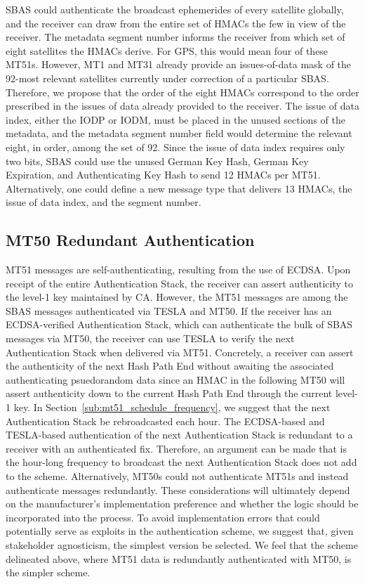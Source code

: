 \documentclass[letterpaper,times]{IONconf/IONconf}
\begin{document}
		SBAS could authenticate the broadcast ephemerides of every satellite globally, and the receiver can draw from the entire set of HMACs the few in view of the receiver.
		The metadata segment number informs the receiver from which set of eight satellites the HMACs derive.
		For GPS, this would mean four of these MT51s.
		However, MT1 and MT31 already provide an issues-of-data mask of the 92-most relevant satellites currently under correction of a particular SBAS.
		Therefore, we propose that the order of the eight HMACs correspond to the order prescribed in the issues of data already provided to the receiver.
		The issue of data index, either the IODP or IODM, must be placed in the unused sections of the metadata, and the metadata segment number field would determine the relevant eight, in order, among the set of 92.
		Since the issue of data index requires only two bits, SBAS could use the unused German Key Hash, German Key Expiration, and Authenticating Key Hash to send 12 HMACs per MT51.
		Alternatively, one could define a new message type that delivers 13 HMACs, the issue of data index, and the segment number.

	\subsection{MT50 Redundant Authentication} \label{sub:mt50_redundant_authentication}

		MT51 messages are self-authenticating, resulting from the use of ECDSA.
		Upon receipt of the entire Authentication Stack, the receiver can assert authenticity to the level-1 key maintained by CA.
		However, the MT51 messages are among the SBAS messages authenticated via TESLA and MT50.
		If the receiver has an ECDSA-verified Authentication Stack, which can authenticate the bulk of SBAS messages via MT50, the receiver can use TESLA to verify the next Authentication Stack when delivered via MT51.
		Concretely, a receiver can assert the authenticity of the next Hash Path End without awaiting the associated authenticating psuedorandom data since an HMAC in the following MT50 will assert authenticity down to the current Hash Path End through the current level-1 key.
		In Section~\ref{sub:mt51_schedule_frequency}, we suggest that the next Authentication Stack be rebroadcasted each hour.
		The ECDSA-based and TESLA-based authentication of the next Authentication Stack is redundant to a receiver with an authenticated fix.
		Therefore, an argument can be made that is the hour-long frequency to broadcast the next Authentication Stack does not add to the scheme.
		Alternatively, MT50s could not authenticate MT51s and instead authenticate messages redundantly.
		These considerations will ultimately depend on the manufacturer's implementation preference and whether the logic should be incorporated into the process.
		To avoid implementation errors that could potentially serve as exploits in the authentication scheme, we suggest that, given stakeholder agnosticism, the simplest version be selected.
		We feel that the scheme delineated above, where MT51 data is redundantly authenticated with MT50, is the simpler scheme.
\end{document}
